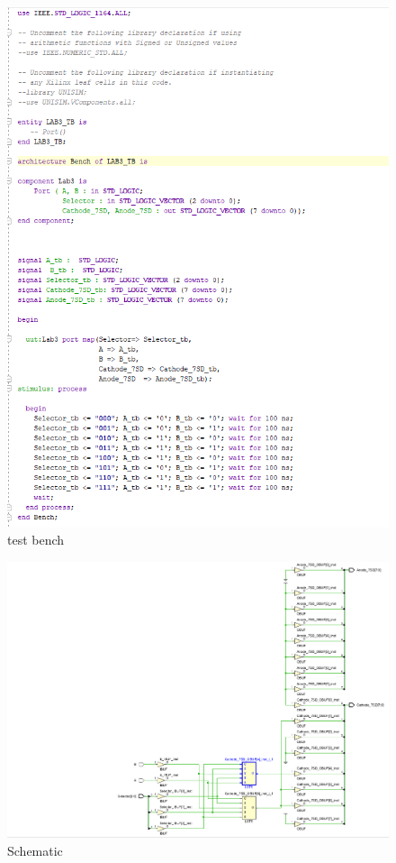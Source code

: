 \documentclass{article}
\begin{document}
\begin{figure}[h]
\begin{center}
\includegraphics[width=1\textwidth]{DecoderTestSource.png} %
\caption{test bench}
\end{center}
\end{figure}

\begin{figure}[h]
\begin{center}
\includegraphics[width=1\textwidth]{DecoderSchematic.png} %
\caption{Schematic}
\end{center}
\end{figure}
\end{document}
